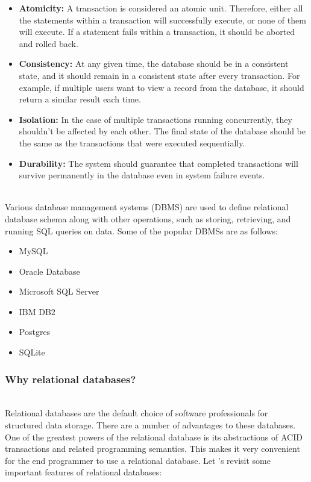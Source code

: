 \begin{itemize}
\item
\protect{}\label{vOe_XpK_bx79NeePaA_iw}
\textbf{Atomicity:} A transaction is considered an atomic unit. Therefore, either all the statements within a transaction will successfully execute, or none of them will execute. If a statement fails within a transaction, it should be aborted and rolled back.
\item
\protect{}\label{qVUVgUc2xCV-4EaX8sh-M}
\textbf{Consistency:} At any given time, the database should be in a consistent state, and it should remain in a consistent state after every transaction. For example, if multiple users want to view a record from the database, it should return a similar result each time.
\item
\protect{}\label{bePGv26R2sMjViT4h0-S5}
\textbf{Isolation:} In the case of multiple transactions running concurrently, they shouldn't be affected by each other. The final state of the database should be the same as the transactions that were executed sequentially.
\item
\protect{}\label{ziEKzBBzitLWOBQFXb4Nf}
\textbf{Durability:} The system should guarantee that completed transactions will survive permanently in the database even in system failure events.
\end{itemize}
\\
Various database management systems (DBMS) are used to define relational database schema along with other operations, such as storing, retrieving, and running SQL queries on data. Some of the popular DBMSs are as follows:

\begin{itemize}
\item
\protect{}\label{e3dU8wfsKYUMA18xwQx9O}
MySQL
\item
\protect{}\label{MjkiOf7eCA4HXhUHeM5c3}
Oracle Database
\item
\protect{}\label{50eUurx541gvE7I3duYye}
Microsoft SQL Server
\item
\protect{}\label{251wD8BhjUVGAo9cgBOzv}
IBM DB2
\item
\protect{}\label{4r2HEOBTxK2Qtq0qhMnap}
Postgres
\item
\protect{}\label{O5gK6T4czAXARp6Ck4CZK}
SQLite
\end{itemize}

\subsubsection{Why relational databases?}\label{B7Q-i8G69olvY1sn4sYRI}
\\
Relational databases are the default choice of software professionals for structured data storage. There are a number of advantages to these databases. One of the greatest powers of the relational database is its abstractions of ACID transactions and related programming semantics. This makes it very convenient for the end programmer to use a relational database. Let 's revisit some important features of relational databases:
\\
